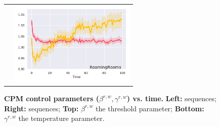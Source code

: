 \begin{figure}
\begin{tabular}{cc}
\quad
&
\includegraphics[height=4.0cm,trim={0.3cm 0cm 0cm 0},clip]{figures/matterport-gamma.pdf}
\\
\end{tabular}
\vspace{-0.1in}
\fi
\caption{\textbf{CPM control parameters ($\beta^{r,w}, \gamma^{r,w}$) vs. time.}
\textbf{Left:} \ourchar{} sequences; \textbf{Right:} \ourroom{} sequences; \textbf{Top:}
$\beta^{r,w}$ the threshold parameter; \textbf{Bottom:} $\gamma^{r,w}$ the temperature parameter.}
\label{fig:betagamma}
\end{figure}
